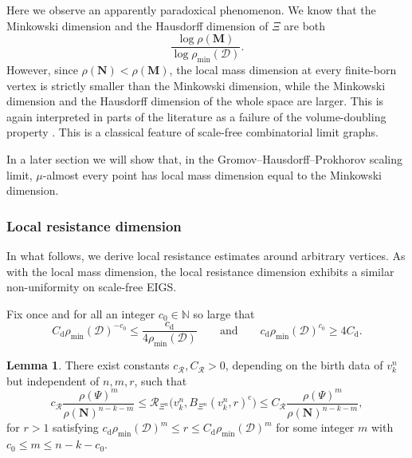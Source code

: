\documentclass{article}
\theoremstyle{plain}
\theoremstyle{definition}
\newtheorem{lemma}[theorem]{Lemma}
\newcommand{\dist}{\mathrm{d}}
\newcommand{\Reff}{\mathscr{R}}
\begin{document}
Here we observe an apparently paradoxical phenomenon.
We know that the Minkowski dimension and the Hausdorff dimension of $\Xi$ are both
\[
\frac{\log \rho(\mathbf M)}{\log \rho_{\min}(\mathcal D)}.
\]
However, since $\rho(\mathbf N)<\rho(\mathbf M)$, the local mass dimension at every finite-born vertex is strictly smaller than the Minkowski dimension, while the Minkowski dimension and the Hausdorff dimension of the whole space are larger.
This is again interpreted in parts of the literature as a failure of the volume-doubling property \cite{hambly2010diffusion}.
This is a classical feature of scale-free combinatorial limit graphs.

In a later section we will show that, in the Gromov--Hausdorff--Prokhorov scaling limit, $\mu$-almost every point has local mass dimension equal to the Minkowski dimension.

\subsubsection*{Local resistance dimension}

In what follows, we derive local resistance estimates around arbitrary vertices.
As with the local mass dimension, the local resistance dimension exhibits a similar non-uniformity on scale-free EIGS.

Fix once and for all an integer $c_0\in\mathbb N$ so large that
\[
C_{\dist}\rho_{\min}(\mathcal D)^{-c_0}\le \frac{c_{\dist}}{4\rho_{\min}(\mathcal D)}
\qquad\text{and}\qquad
c_{\dist}\rho_{\min}(\mathcal D)^{c_0}\ge 4C_{\dist}.
\]

\begin{lemma}\label{lem:mesoscopic_Reff_k_born}
There exist constants $c_{\mathscr R},C_{\mathscr R}>0$, depending on the birth data of $v_k^n$ but independent of $n,m,r$, such that
\[
c_{\mathscr R} \frac{\rho(\Psi)^m}{\rho(\mathbf N)^{n-k-m}}
\le
\Reff_{\Xi^n}\bigl(v_k^n,B_{\Xi^n}(v_k^n,r)^{\mathrm c}\bigr)
\le
C_{\mathscr R} \frac{\rho(\Psi)^m}{\rho(\mathbf N)^{n-k-m}},
\]
for $r>1$ satisfying
$
c_{\dist} \rho_{\min}(\mathcal D)^m
\le
r
\le
C_{\dist} \rho_{\min}(\mathcal D)^m
$
for some integer $m$ with $c_0\le m\le n-k-c_0$.
\end{lemma}
\end{document}
